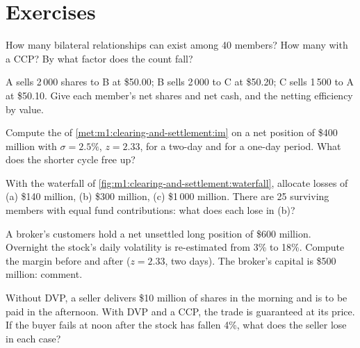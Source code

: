 \section{Exercises}

\begin{exercise}[$\star$]\label{exo:m1:clearing-and-settlement:1}
How many bilateral relationships can exist among 40 members? How many with a
CCP? By what factor does the count fall?
\end{exercise}

\begin{exercise}[$\star$]\label{exo:m1:clearing-and-settlement:2}
A sells 2\,000 shares to B at \$50.00; B sells 2\,000 to C at \$50.20; C sells
1\,500 to A at \$50.10. Give each member's net shares and net cash, and the
netting efficiency by value.
\end{exercise}

\begin{exercise}[$\star$]\label{exo:m1:clearing-and-settlement:3}
Compute the  of \cref{met:m1:clearing-and-settlement:im} on a
net position of \$400 million with $\sigma = 2.5\%$, $z = 2.33$, for a
two-day and for a one-day period. What does the shorter cycle free up?
\end{exercise}

\begin{exercise}[$\star\star$]\label{exo:m1:clearing-and-settlement:4}
With the waterfall of \cref{fig:m1:clearing-and-settlement:waterfall},
allocate losses of (a) \$140 million, (b) \$300 million, (c) \$1\,000
million. There are 25 surviving members with equal fund contributions: what
does each lose in (b)?
\end{exercise}

\begin{exercise}[$\star\star$]\label{exo:m1:clearing-and-settlement:5}
A broker's customers hold a net unsettled long position of \$600 million.
Overnight the stock's daily volatility is re-estimated from 3\% to 18\%.
Compute the margin before and after ($z = 2.33$, two days). The broker's
capital is \$500 million: comment.
\end{exercise}

\begin{exercise}[$\star\star$]\label{exo:m1:clearing-and-settlement:6}
Without DVP, a seller delivers \$10 million of shares in the morning and is
to be paid in the afternoon. With DVP and a CCP, the trade is guaranteed at
its price. If the buyer fails at noon after the stock has fallen 4\%, what
does the seller lose in each case?
\end{exercise}

